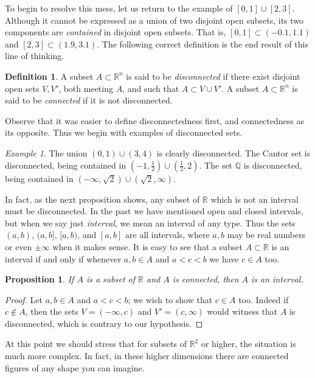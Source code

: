 \documentclass[11pt,oneside]{amsbook}
\newcommand{\Q}{\mathbb Q}
\newcommand{\R}{\mathbb R}
\theoremstyle{definition}
\theoremstyle{plain}
\newtheorem{proposition}[theorem]{Proposition}
\theoremstyle{definition}
\newtheorem{definition}[theorem]{Definition}
\theoremstyle{remark}
\newtheorem{example}[theorem]{Example}
\numberwithin{equation}{section}
\numberwithin{figure}{section}
\begin{document}
To begin to resolve this mess, let us return to the example of $[0,1]\cup[2,3]$. Although it cannot be expressed as a union of two disjoint open subsets, its two components are \emph{contained} in disjoint open subsets. That is, $[0,1]\subset(-0.1,1.1)$ and $[2,3]\subset(1.9,3.1)$. The following correct definition is the end result of this line of thinking.

\begin{definition}
  A subset $A\subset\R^n$ is said to be \emph{disconnected} if there exist disjoint open sets $V,V'$, both meeting $A$, and such that $A\subset V\cup V'$. A subset $A\subset\R^n$ is said to be \emph{connected} if it is not disconnected.
\end{definition}

Observe that it was easier to define disconnectedness first, and connectedness as its opposite. Thus we begin with examples of disconnected sets.

\begin{example}
  The union $(0,1)\cup(3,4)$ is clearly disconnected. The Cantor set is disconnected, being contained in $(-1,\frac12)\cup(\frac12,2)$. The set $\Q$ is disconnected, being contained in $(-\infty,\sqrt2)\cup(\sqrt2,\infty)$.
\end{example}

In fact, as the next proposition shows, any subset of $\R$ which is not an interval must be disconnected. In the past we have mentioned open and closed intervals, but when we say just \emph{interval}, we mean an interval of any type. Thus the sets $(a,b)$, $(a,b]$, $[a,b)$, and $[a,b]$ are all intervals, where $a,b$ may be real numbers or even $\pm\infty$ when it makes sense. It is easy to see that a subset $A\subset\R$ is an interval if and only if whenever $a,b\in A$ and $a<c<b$ we have $c\in A$ too.

\begin{proposition}
  If $A$ is a subset of $\R$ and $A$ is connected, then $A$ is an interval.
\end{proposition}

\begin{proof}
  Let $a,b\in A$ and $a<c<b$; we wish to show that $c\in A$ too. Indeed if $c\notin A$, then the sets $V=(-\infty,c)$ and $V'=(c,\infty)$ would witness that $A$ is disconnected, which is contrary to our hypothesis.
\end{proof}

At this point we should stress that for subsets of $\R^2$ or higher, the situation is much more complex. In fact, in these higher dimensions there are connected figures of any shape you can imagine.
\end{document}
